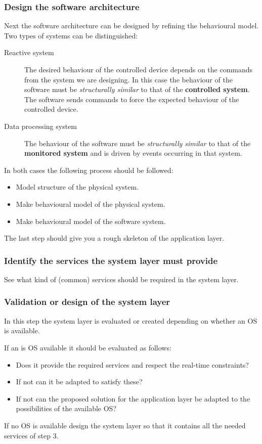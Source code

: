 \documentclass[../main.tex]{subfiles}
\begin{document}
\subsubsection{Design the software architecture}
\label{sss:design}
Next the software architecture can be designed by refining the behavioural model. 
Two types of systems can be distinguished:
\begin{description}
	\item[Reactive system] The desired behaviour of the controlled device depends on the commands from the system we are designing.
		In this case the behaviour of the software must be \emph{structurally similar} to that of the \textbf{controlled system}.
		The software sends commands to force the expected behaviour of the controlled device.
	\item[Data processing system] The behaviour of the software must be \emph{structurally similar} to that of the \textbf{monitored system} and is driven by events occurring in that system.
\end{description}

In both cases the following process should be followed:
\begin{itemize}
	\item Model structure of the physical system. 
	\item Make behavioural model of the physical system.
	\item Make behavioural model of the software system.
\end{itemize}

The last step should give you a rough skeleton of the application layer.

\subsubsection{Identify the services the system layer must provide}
\label{sss:services}
See what kind of (common) services should be required in the system layer. 

\subsubsection{Validation or design of the system layer}
\label{sss:valid}
In  this step the system layer is evaluated or created depending on whether an OS is available.

If an is OS available it should be evaluated as follows:
\begin{itemize}
	\item Does it provide the required services and respect the real-time constraints? 
	\item If not can it be adapted to satisfy these?
	\item If not can the proposed solution for the application layer be adapted to the possibilities of the available OS?
\end{itemize}
If no OS is available design the system layer so that it contains all the needed services of step 3.
\end{document}
